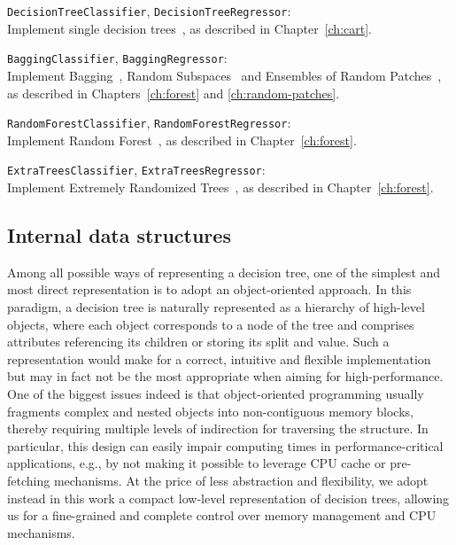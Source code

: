 \begin{description}
\item \texttt{DecisionTreeClassifier}, \texttt{DecisionTreeRegressor}: \hfill \\
    Implement single decision trees~\citep{breiman:1984}, as described in Chapter~\ref{ch:cart}.

\item \texttt{BaggingClassifier}, \texttt{BaggingRegressor}: \hfill \\
    Implement Bagging~\citep{breiman:1996b}, Random Subspaces~\citep{ho:1998}
    and Ensembles of Random Patches~\citep{louppe:2012}, as described in Chapters~\ref{ch:forest}
    and \ref{ch:random-patches}.

\item \texttt{RandomForestClassifier}, \texttt{RandomForestRegressor}: \hfill \\
    Implement Random Forest~\citep{breiman:2001},  as described in Chapter~\ref{ch:forest}.

\item \texttt{ExtraTreesClassifier}, \texttt{ExtraTreesRegressor}: \hfill \\
    Implement Extremely Randomized Trees~\citep{geurts:2006},  as described in Chapter~\ref{ch:forest}.
\end{description}


\subsection{Internal data structures}

Among all possible ways of representing a decision tree, one of the simplest and most
direct representation is to adopt an object-oriented approach. In this
paradigm, a decision tree is naturally represented as a hierarchy of high-level
objects, where each object corresponds to a node of the tree and comprises
attributes referencing its children or storing its split and value. Such a
representation would make for a correct, intuitive and flexible implementation
but may in fact not be the most appropriate when aiming for high-performance.
One of the biggest issues indeed is that object-oriented programming usually
fragments complex and nested objects into non-contiguous memory blocks, thereby
requiring multiple levels of indirection for traversing the structure. In
particular, this design can easily impair computing times in
performance-critical applications, e.g., by not making it possible to leverage CPU cache or
pre-fetching mechanisms.
At the price of less abstraction and flexibility, we adopt instead in this work
a compact low-level representation of decision trees, allowing us for a fine-grained
and complete control over memory management and CPU mechanisms.

